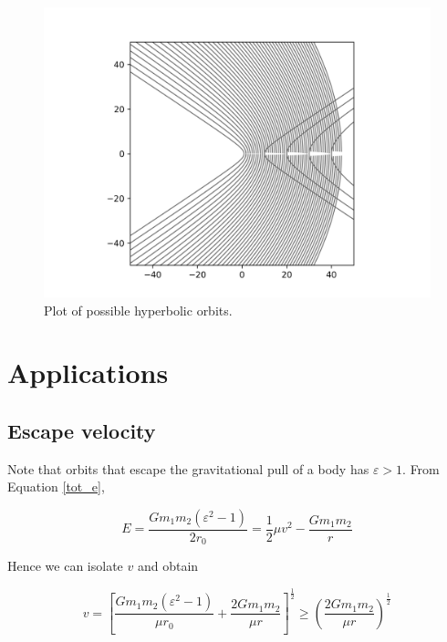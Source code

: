 \begin{frame}{\subsecname}
\begin{figure}
    \centering
    \includegraphics[height = 0.8\textheight]{assets/hyperbola.png}
    \caption{Plot of possible hyperbolic orbits.}
    \label{fig:my_label}
\end{figure}
\end{frame}

\section{Applications}
\subsection{Escape velocity}

\begin{frame}{\subsecname}

Note that orbits that escape the gravitational pull of a body has \(\varepsilon > 1\). From Equation \ref{tot_e}, 

\begin{equation}
E = \frac{Gm_1m_2(\varepsilon^2-1)}{2r_0} = \frac{1}{2} \mu v^2 - \frac{Gm_1m_2}{r}
\end{equation}

Hence we can isolate \(v\) and obtain

\begin{equation}
v = \left[\frac{Gm_1m_2(\varepsilon^2-1)}{\mu r_0} + \frac{2Gm_1m_2}{\mu r}\right]^{\frac{1}{2}} \geq  \left(\frac{2Gm_1m_2}{\mu r}\right)^{\frac{1}{2}}
\end{equation}

\end{frame}

